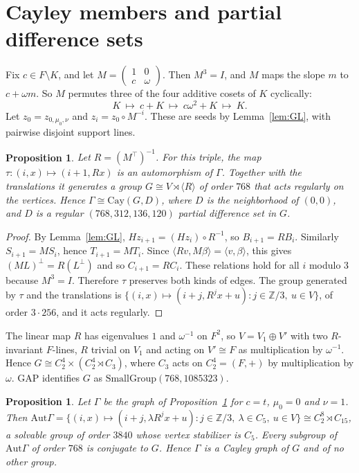 \documentclass[11pt]{amsart}
\newtheorem{proposition}[theorem]{Proposition}
\theoremstyle{definition}
\newcommand{\Aut}{\mathrm{Aut}}
\newcommand{\Cay}{\mathrm{Cay}}
\begin{document}
\section{Cayley members and partial difference sets}\label{sec:cayley}

Fix $c\in F\setminus K$, and let $M=\begin{pmatrix}1&0\\c&\omega\end{pmatrix}$. Then $M^3=I$, and $M$ maps the slope $m$ to $c+\omega m$. So $M$ permutes three of the four additive cosets of $K$ cyclically:
\[
K\ \longmapsto\ c+K\ \longmapsto\ c\omega^2+K\ \longmapsto\ K .
\]
Let $z_0=z_{0,\mu_0,\nu}$ and $z_i=z_0\circ M^{-i}$. These are seeds by Lemma~\ref{lem:GL}, with pairwise disjoint support lines.

\begin{proposition}\label{prop:cayley}
Let $R=(M^\top)^{-1}$. For this triple, the map $\tau\colon(i,x)\mapsto(i+1,Rx)$ is an automorphism of $\Gamma$. Together with the translations it generates a group $G\cong V\rtimes\langle R\rangle$ of order $768$ that acts regularly on the vertices. Hence $\Gamma\cong\Cay(G,D)$, where $D$ is the neighborhood of $(0,0)$, and $D$ is a regular $(768,312,136,120)$ partial difference set in $G$.
\end{proposition}

\begin{proof}
By Lemma~\ref{lem:GL}, $Hz_{i+1}=(Hz_i)\circ R^{-1}$, so $B_{i+1}=RB_i$. Similarly $S_{i+1}=MS_i$, hence $T_{i+1}=MT_i$. Since $\langle Rv,M\beta\rangle=\langle v,\beta\rangle$, this gives $(ML)^\perp=R(L^\perp)$ and so $C_{i+1}=RC_i$. These relations hold for all $i$ modulo $3$ because $M^3=I$. Therefore $\tau$ preserves both kinds of edges. The group generated by $\tau$ and the translations is $\{(i,x)\mapsto(i+j,R^jx+u):j\in\mathbb Z/3,\ u\in V\}$, of order $3\cdot256$, and it acts regularly.
\end{proof}

The linear map $R$ has eigenvalues $1$ and $\omega^{-1}$ on $F^2$, so $V=V_1\oplus V'$ with two $R$-invariant $F$-lines, $R$ trivial on $V_1$ and acting on $V'\cong F$ as multiplication by $\omega^{-1}$. Hence $G\cong C_2^4\times(C_2^4\rtimes C_3)$, where $C_3$ acts on $C_2^4=(F,+)$ by multiplication by $\omega$. GAP identifies $G$ as $\mathrm{SmallGroup}(768,1085323)$.

\begin{proposition}\label{prop:aut}
Let $\Gamma$ be the graph of Proposition~\ref{prop:cayley} for $c=t$, $\mu_0=0$ and $\nu=1$. Then $\Aut\Gamma=\{(i,x)\mapsto(i+j,\lambda R^jx+u): j\in\mathbb Z/3,\ \lambda\in C_5,\ u\in V\}\cong C_2^8\rtimes C_{15}$, a solvable group of order $3840$ whose vertex stabilizer is $C_5$. Every subgroup of $\Aut\Gamma$ of order $768$ is conjugate to $G$. Hence $\Gamma$ is a Cayley graph of $G$ and of no other group.
\end{proposition}
\end{document}
